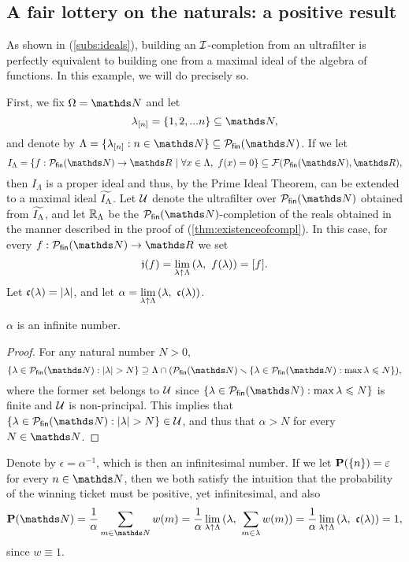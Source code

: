 \documentclass[draft.tex]{subfiles}
\begin{document}
    \subsection{A fair lottery on the naturals: a positive result}
    As shown in (\ref{subs:ideals}), building an $\mathcal{I}$-completion from an ultrafilter is perfectly equivalent to building one from a maximal ideal of the algebra of functions. In this example, we will do precisely so.
    \par First, we fix $\Omega = \NN$ and let
    \begin{equation*}
        \lambda_{[n]} = \{1, 2, ... n\} \subseteq \NN,
    \end{equation*}
    and denote by $\Lambda = \{\lambda_{[n]}: n \in \NN\} \subseteq \finset{\NN}$. If we let
    \begin{equation*}
        I_{\Lambda} = \{f: \finset{\NN} \to \RR \ \vert \ \forall x \in \Lambda, \ f(x) = 0\} \subseteq \cl{F}(\finset{\NN}, \RR),
    \end{equation*}
    then $I_{\Lambda}$ is a proper ideal and thus, by the Prime Ideal Theorem, can be extended to a maximal ideal $\widetilde{I_{\Lambda}}$. Let $\mathcal{U}$ denote the ultrafilter over $\finset{\NN}$ obtained from $\widetilde{I_{\Lambda}}$, and let $\mathbb{R}_{\Lambda}$ be the $\finset{\NN}$-completion of the reals obtained in the manner described in the proof of (\ref{thm:existenceofcompl}). In this case, for every $f: \finset{\NN} \to \RR$ we set
    \begin{equation*}
        \mathfrak{j}(f) = \lim\limits_{\lambda \uparrow \Lambda}{(\lambda, \ f(\lambda))} = [f].
    \end{equation*}
    Let $\mathfrak{c}(\lambda) = \vert \lambda \vert$, and let $\alpha = \lambdalim{(\lambda, \ \fk{c}(\lambda))}$.
    \begin{lemma}
    $\alpha$ is an infinite number.
    \end{lemma}
    \begin{proof}
    For any natural number $N > 0$,
    \begin{equation*}
        \{\lambda \in \finset{\NN}: \vert \lambda \vert > N\} \supseteq \Lambda \cap (\finset{\NN} \sm \{\lambda \in \finset{\NN}: \max{\lambda} \leq N\}),
    \end{equation*}
    where the former set belongs to $\mathcal{U}$ since $\{\lambda \in \finset{\NN}: \max{\lambda} \leq N\}$ is finite and $\mathcal{U}$ is non-principal. This implies that $\{\lambda \in \finset{\NN}: \vert\lambda\vert > N\} \in \cl{U}$, and thus that $\alpha > N$ for every $N \in \NN$.
    \end{proof}
    Denote by $\epsilon = \alpha^{-1}$, which is then an infinitesimal number. If we let $\textbf{P}(\{n\}) = \varepsilon$ for every $n \in \NN$, then we both satisfy the intuition that the probability of the winning ticket must be positive, yet infinitesimal, and also
    \begin{equation*}
        \prob(\NN) = \frac{1}{\alpha} \sum\limits_{m \in \NN} w(m) = \frac{1}{\alpha} \lambdalim{(\lambda, \ \sum\limits_{m \in \lambda} w(m))} = \frac{1}{\alpha} \lambdalim{(\lambda, \ \fk{c}(\lambda))} = 1,
    \end{equation*}
    since $w \equiv 1$.
\end{document}
